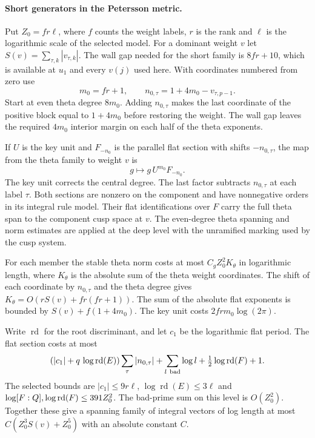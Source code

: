 \paragraph{Short generators in the Petersson metric.}
Put \(Z_0=fr\ell\), where \(f\) counts the weight labels,
\(r\) is the rank and \(\ell\) is the logarithmic scale of
the selected model. For a dominant weight \(v\) let
\(S(v)=\sum_{\tau,k}|v_{\tau,k}|\).
The wall gap needed for the short family is
\(8fr+10\), which is available at \(u_1\) and every \(v(j)\)
used here. With coordinates numbered from zero use
\[
         m_0=fr+1,\qquad
         n_{0,\tau}=1+4m_0-v_{\tau,p-1}.
\]
Start at even theta degree \(8m_0\). Adding \(n_{0,\tau}\) makes the last coordinate of the positive block
equal to \(1+4m_0\) before restoring the weight. The wall gap
leaves the required \(4m_0\) interior margin on each
half of the theta exponents.

If \(U\) is the key unit and \(F_{-n_0}\) is the
parallel flat section with shifts \(-n_{0,\tau}\), the
map from the theta family to weight \(v\) is
\[
                  g\longmapsto g\,U^{m_0}F_{-n_0}.
\]
The key unit corrects the central degree. The last
factor subtracts \(n_{0,\tau}\) at each label \(\tau\). Both sections
are nonzero on the component and have nonnegative
orders in its integral rule model. Their flat
identifications over \(F\) carry the full theta span
to the component cusp space at \(v\). The even-degree
theta spanning and norm estimates are applied at the
deep level with the unramified marking used by the
cusp system.



For each member the stable theta norm costs at most
\(C_g Z_0^2 K_{\theta}\) in logarithmic length, where
\(K_{\theta}\) is the absolute sum of the theta weight
coordinates. The shift of each coordinate by \(n_{0,\tau}\)
and the theta degree gives
\(K_{\theta}=O(rS(v)+fr(fr+1))\). The sum of the absolute
flat exponents is bounded by \(S(v)+f(1+4m_0)\).
The key unit costs \(2fr m_0\log(2\pi)\).

Write \(\operatorname{rd}\) for the root discriminant, and
let \(c_1\) be the logarithmic flat period.
The flat
section costs at most
\[
 (|c_1|+q\,\log\operatorname{rd}(E))
     \sum_\tau |n_{0,\tau}|
 +\sum_{l\ {\rm bad}}\log l
 +\tfrac12\log\operatorname{rd}(F)+1 .
\]
The selected
bounds are \(|c_1|\le9r\ell\),
\(\log\operatorname{rd}(E)\le3\ell\) and
\(\log[F:Q],\log\operatorname{rd}(F)\le391Z_0^2\).
The bad-prime sum on this level is \(O(Z_0^2)\).
Together these give a spanning family of integral
vectors of log length at most
\(C(Z_0^3S(v)+Z_0^5)\) with an absolute constant \(C\).
\label{cor:covolume-hilbert-samuel-1}

